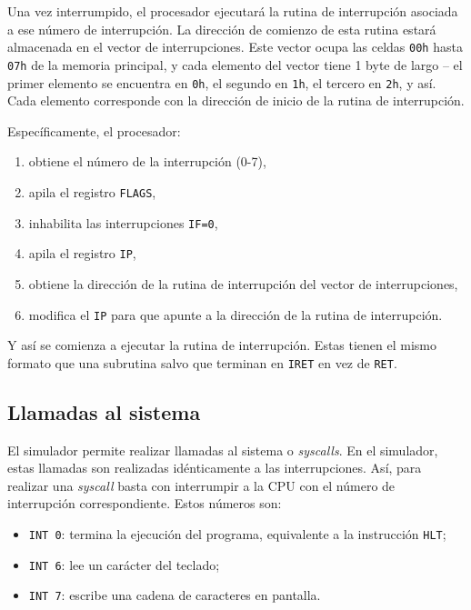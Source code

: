 \documentclass[12pt,oneside]{templates/unerthesis}
\providecommand{\tightlist}{%
  \setlength{\itemsep}{0pt}\setlength{\parskip}{0pt}}
\begin{document}
Una vez interrumpido, el procesador ejecutará la rutina de interrupción asociada a ese número de interrupción. La dirección de comienzo de esta rutina estará almacenada en el vector de interrupciones. Este vector ocupa las celdas \texttt{00h} hasta \texttt{07h} de la memoria principal, y cada elemento del vector tiene 1 byte de largo -- el primer elemento se encuentra en \texttt{0h}, el segundo en \texttt{1h}, el tercero en \texttt{2h}, y así. Cada elemento corresponde con la dirección de inicio de la rutina de interrupción.

Específicamente, el procesador:

\begin{enumerate}
\def\labelenumi{\arabic{enumi}.}
\tightlist
\item
  obtiene el número de la interrupción (0-7),
\item
  apila el registro \texttt{FLAGS},
\item
  inhabilita las interrupciones \texttt{IF=0},
\item
  apila el registro \texttt{IP},
\item
  obtiene la dirección de la rutina de interrupción del vector de interrupciones,
\item
  modifica el \texttt{IP} para que apunte a la dirección de la rutina de interrupción.
\end{enumerate}

Y así se comienza a ejecutar la rutina de interrupción. Estas tienen el mismo formato que una subrutina salvo que terminan en \texttt{IRET} en vez de \texttt{RET}.

\hypertarget{llamadas-al-sistema}{%
\subsection{Llamadas al sistema}\label{llamadas-al-sistema}}

El simulador permite realizar llamadas al sistema o \emph{syscalls}. En el simulador, estas llamadas son realizadas idénticamente a las interrupciones. Así, para realizar una \emph{syscall} basta con interrumpir a la CPU con el número de interrupción correspondiente. Estos números son:

\begin{itemize}
\tightlist
\item
  \texttt{INT\ 0}: termina la ejecución del programa, equivalente a la instrucción \texttt{HLT};
\item
  \texttt{INT\ 6}: lee un carácter del teclado;
\item
  \texttt{INT\ 7}: escribe una cadena de caracteres en pantalla.
\end{itemize}
\end{document}
